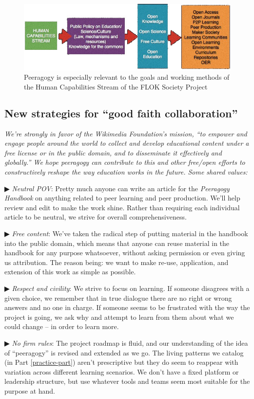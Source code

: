 \begin{figure}
\includegraphics[width=\textwidth]{../pictures/flok2.jpg}
\caption*{Peeragogy is especially relevant to the goals and working methods of the Human Capabilities Stream of the FLOK Society Project}
\end{figure}

\clearpage


\label{good-faith-collaboration}
\subsection{New strategies for ``good faith collaboration''}

\noindent \emph{We're strongly in favor of the Wikimedia
  Foundation's mission, ``to empower and engage people around the
  world to collect and develop educational content under a free
  license or in the public domain, and to disseminate it effectively
  and globally.''  We hope peeragogy can contribute to this and
  other free/open efforts to constructively reshape the way education
  works in the future.  Some shared values:}

▶ \emph{Neutral POV}: Pretty much anyone can write an article for the
\emph{Peeragogy Handbook} on anything related to peer learning and
peer production.  We'll help review and edit to make the work shine.
Rather than requiring each individual article to be neutral, we strive
for overall comprehensiveness.

▶ \emph{Free content}: We've taken the radical step of putting
material in the handbook into the public domain, which means that
anyone can reuse material in the handbook for any purpose whatsoever,
without asking permission or even giving us attribution.  The reason
being: we want to make re-use, application, and extension of this work
as simple as possible.

▶ \emph{Respect and civility}: We strive to focus on learning.  If
someone disagrees with a given choice, we remember that in true
dialogue there are no right or wrong answers and no one in charge.  If
someone seems to be frustrated with the way the project is going, we
ask why and attempt to learn from them about what we could change --
in order to learn more.

▶ \emph{No firm rules}: The project roadmap is fluid, and our
understanding of the idea of ``peeragogy'' is revised and extended as
we go.  The living patterns we catalog (in Part \ref{practice-part})
aren't prescriptive but they do seem to reappear with variation across
different learning scenarios.  We don't have a fixed platform or
leadership structure, but use whatever tools and teams seem most
suitable for the purpose at hand.

